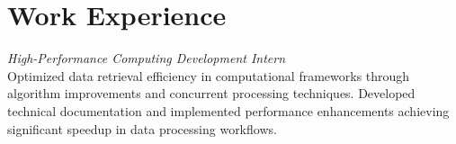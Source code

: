 \section{Work Experience}
\textit{High-Performance Computing Development Intern}\\[0.5ex]
Optimized data retrieval efficiency in computational frameworks through algorithm improvements and concurrent processing techniques. Developed technical documentation and implemented performance enhancements achieving significant speedup in data processing workflows.
